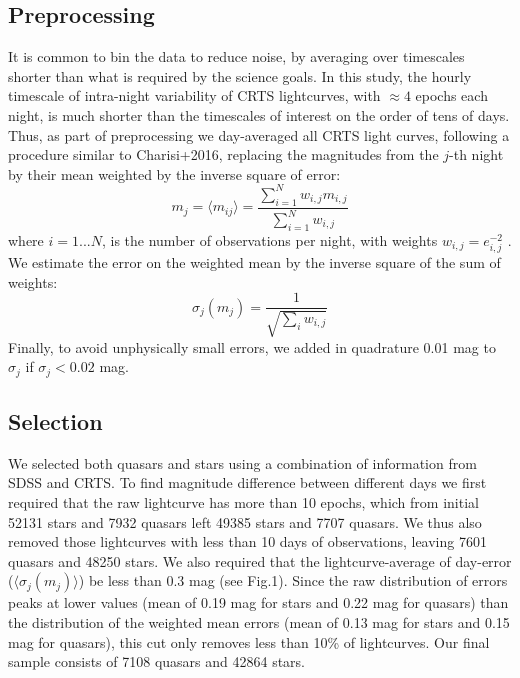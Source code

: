 \documentclass[fleqn,usenatbib]{mnras}  %
\begin{document}
\subsection{Preprocessing}

It is common to bin the data to reduce noise, by averaging over timescales shorter than what is required by the science goals. In this study, the hourly timescale of intra-night variability of CRTS lightcurves, with $\approx 4$ epochs each night, is much shorter than the timescales of interest on the order of tens of days.  Thus, as part of preprocessing we day-averaged all  CRTS light curves, following a procedure similar to Charisi+2016, replacing the magnitudes  from the  $j$-th  night by their mean weighted by the inverse square of error:
\begin{equation}
 m_{j} = \langle m_{ij} \rangle = \frac{\sum_{i=1}^{N} {w_{i,j} m_{i,j}} } {\sum_{i=1}^{N} {w_{i,j}} }
\end{equation}
where $i=1...N$, is the number of observations per night, with weights $w_{i,j} = e_{i,j}^{-2}$ .  
We estimate the error on the weighted mean by the inverse square of the sum of weights:  
\begin{equation}
\sigma_{j}(m_{j}) = \frac{1}{\sqrt{\sum_{i}{w_{i,j}}}}
\end{equation}  Finally, to avoid unphysically small errors, we added in quadrature 0.01 mag  to $\sigma_{j}$ if $\sigma_{j} < 0.02 $ mag. 


\subsection{Selection}
We selected both quasars and stars using a combination of information from SDSS and CRTS. To find magnitude difference between different days we first required that the raw lightcurve has more than 10 epochs, which from initial 52131 stars and 7932 quasars left 49385 stars and 7707 quasars. We thus also removed those lightcurves with less than 10 days of observations, leaving 7601 quasars and 48250 stars.  We also required that the lightcurve-average of day-error ($\langle \sigma_{j}(m_{j}) \rangle$) be less than 0.3 mag (see Fig.1). Since the raw distribution of errors   peaks at lower values (mean of 0.19 mag for stars and 0.22 mag for quasars) than the distribution of the weighted mean errors (mean of 0.13 mag for stars and 0.15 mag for quasars), this cut only removes less than 10\% of lightcurves. Our final sample consists of 7108 quasars and 42864 stars.
\end{document}
